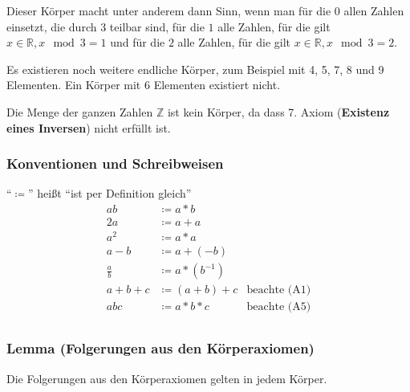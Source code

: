 \documentclass{article}
\begin{document}
Dieser Körper macht unter anderem dann Sinn, wenn man für die $0$ allen Zahlen einsetzt, die durch $3$
teilbar sind, für die $1$ alle Zahlen, für die gilt $x \in \mathbb{R}, x \mod 3 = 1$ und für die $2$
alle Zahlen, für die gilt $x \in \mathbb{R}, x \mod 3 = 2$.

Es existieren noch weitere endliche Körper, zum Beispiel mit 4, 5, 7, 8 und 9 Elementen.
Ein Körper mit 6 Elementen existiert nicht.

Die Menge der ganzen Zahlen $\mathbb{Z}$ ist kein Körper, da dass 7. Axiom (\textbf{Existenz eines Inversen})
nicht erfüllt ist.

\addtocounter{subsubsection}{1}

\subsubsection{Konventionen und Schreibweisen}

``$\coloneqq$'' heißt ``ist per Definition gleich''
\begin{align*}
  ab &\coloneqq a * b \\
  2a &\coloneqq a + a \\
  a^2 &\coloneqq a * a \\
  a - b &\coloneqq a + (-b) \\
  \frac{a}{b} &\coloneqq a * (b^{-1}) \\
  a + b + c &\coloneqq (a + b) + c &\text{beachte (A1)} \\
  abc &\coloneqq a * b * c &\text{beachte (A5)} \\
\end{align*}

\subsubsection{Lemma (Folgerungen aus den Körperaxiomen)}

Die Folgerungen aus den Körperaxiomen gelten in jedem Körper.
\end{document}

